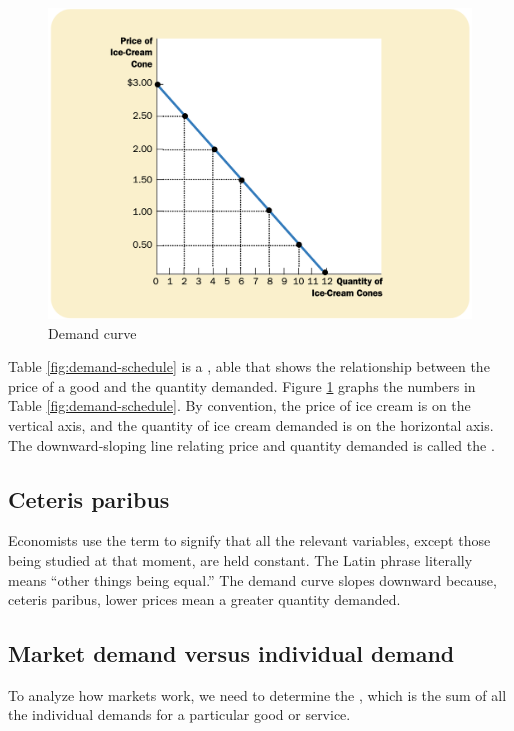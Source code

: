 \begin{figure}[!ht]
  \centering
  \includegraphics[width=\textwidth]{pics/demand-curve}
  \caption{Demand curve}
  \label{fig:demand-curve}
\end{figure}

Table \ref{fig:demand-schedule} is a , able that shows the relationship between the price of a good and the quantity demanded.
Figure \ref{fig:demand-curve} graphs the numbers in Table \ref{fig:demand-schedule}.
By convention, the price of ice cream is on the vertical axis, and the quantity of ice cream demanded is on the horizontal axis.
The downward-sloping line relating price and quantity demanded is called the .

\subsection{Ceteris paribus}

Economists use the term  to signify that all the relevant variables, except those being studied at that moment, are held constant.
The Latin phrase literally means ``other things being equal.''
The demand curve slopes downward because, ceteris paribus, lower prices mean a greater quantity demanded.


\subsection{Market demand versus individual demand}

To analyze how markets work, we need to determine the , which is the sum of all the individual demands for a particular good or service.

